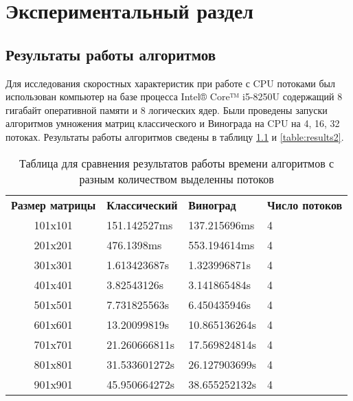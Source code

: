 \chapter{ Экспериментальный раздел}
\section{ Результаты работы алгоритмов}
Для исследования скоростных характеристик при работе с CPU потоками был использован компьютер на базе процесса Intel® Core™ i5-8250U содержащий 8 гигабайт оперативной памяти и 8 логических ядер. Были проведены запуски алгоритмов умножения матриц классического и Винограда на CPU на 4, 16, 32 потоках. Результаты работы алгоритмов сведены в таблицу \ref{table:results} и \ref{table:results2}.

\begin{table}[]
\caption{Таблица для сравнения результатов работы времени алгоритмов с разным количеством выделенны потоков}
\label{table:results}
\begin{tabular}{clll}
\multicolumn{1}{l}{\textbf{Размер матрицы}} & \textbf{Классический} & \textbf{Виноград} & \textbf{Число потоков} \\
101x101                                     & 151.142527ms          & 137.215696ms      & 4                      \\
201x201                                     & 476.1398ms            & 553.194614ms      & 4                      \\
301x301                                     & 1.613423687s          & 1.323996871s      & 4                      \\
401x401                                     & 3.82543126s           & 3.141865484s      & 4                      \\
501x501                                     & 7.731825563s          & 6.450435946s      & 4                      \\
601x601                                     & 13.20099819s          & 10.865136264s     & 4                      \\
701x701                                     & 21.260666811s         & 17.569824814s     & 4                      \\
801x801                                     & 31.533601272s         & 26.127903699s     & 4                      \\
901x901                                     & 45.950664272s         & 38.655252132s     & 4                      \\

\end{tabular}
\end{table}
